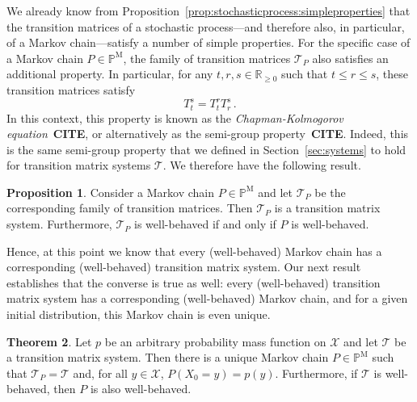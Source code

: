 \documentclass[10pt,a4paper]{paper}
\theoremstyle{definition}
\newtheorem{theorem}{Theorem}
\newtheorem{proposition}[theorem]{Proposition}
\newcommand{\reals}{\mathbb{R}}
\newcommand{\realsnonneg}{\reals_{\geq 0}}
\newcommand{\states}{\mathcal{X}}
\newcommand{\processes}{\mathbb{P}}
\newcommand{\mprocesses}{\processes^{\mathrm{M}}}
\begin{document}

We already know from Proposition~\ref{prop:stochasticprocess:simpleproperties} that the transition matrices of a stochastic process---and therefore also, in particular, of a Markov chain---satisfy a number of simple properties. For the specific case of a Markov chain $P\in\mprocesses$, the family of transition matrices $\mathcal{T}_P$ also satisfies an additional property. In particular, for any $t,r,s\in\realsnonneg$ such that $t\leq r\leq s$, these transition matrices satisfy
\begin{equation*}
T_t^s = T_t^rT_r^s\,.
\end{equation*}
In this context, this property is known as the \emph{Chapman-Kolmogorov equation}~{\bf CITE}, or alternatively as the semi-group property~{\bf CITE}. Indeed, this is the same semi-group property that we defined in Section~\ref{sec:systems} to hold for transition matrix systems $\mathcal{T}$. We therefore have the following result.

\begin{proposition}\label{prop:Markovhassystem}
Consider a Markov chain $P\in\mprocesses$ and let $\mathcal{T}_P$ be the corresponding family of transition matrices. Then $\mathcal{T}_P$ is a transition matrix system. Furthermore, $\mathcal{T}_P$ is well-behaved if and only if $P$ is well-behaved.
\end{proposition}

Hence, at this point we know that every (well-behaved) Markov chain has a corresponding (well-behaved) transition matrix system. Our next result establishes that the converse is true as well: every (well-behaved) transition matrix system has a corresponding (well-behaved) Markov chain, and for a given initial distribution, this Markov chain is even unique.

\begin{theorem}\label{theo:uniqueMarkovchain}
Let $p$ be an arbitrary probability mass function on $\states$ and let $\mathcal{T}$ be a transition matrix system. Then there is a unique Markov chain $P\in\mprocesses$ such that $\mathcal{T}_P=\mathcal{T}$ and, for all $y\in\states$, $P(X_0=y)=p(y)$. Furthermore, if $\mathcal{T}$ is well-behaved, then $P$ is also well-behaved.
\end{theorem}
\end{document}
